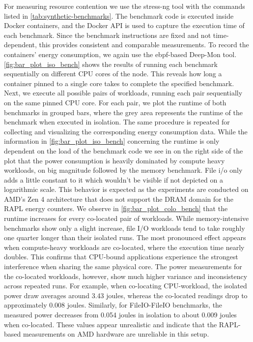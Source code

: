 For measuring resource contention we use the stress-ng tool with the commands listed in \ref{tab:synthetic-benchmarks}. The benchmark code is executed inside Docker containers, and the Docker API is used to capture the execution time of each benchmark. Since the benchmark instructions are fixed and not time-dependent, this provides consistent and comparable measurements. To record the containers' energy consumption, we again use the ebpf-based Deep-Mon tool.
\ref{fig:bar_plot_iso_bench} shows the results of running each benchmark sequentially on different CPU cores of the node. This reveals how long a container pinned to a single core takes to complete the specified benchmark. Next, we execute all possible pairs of workloads, running each pair sequentially on the same pinned CPU core. For each pair, we plot the runtime of both benchmarks in grouped bars, where the grey area represents the runtime of the benchmark when executed in isolation. The same procedure is repeated for collecting and visualizing the corresponding energy consumption data.
While the information in \ref{fig:bar_plot_iso_bench} concerning the runtime is only dependent on the load of the benchmark code we see in on the right side of the plot that the power consumption is heavily dominated by compute heavy workloads, on big magnitude followed by the memory benchmark. File i/o only adds a little constant to it which wouldn't be visible if not depicted on a logarithmic scale. This behavior is expected as the experiments are conducted on AMD's Zen 4 architecture that does not support the DRAM domain for the RAPL energy counters.
We observe in \ref{fig:bar_plot_colo_bench} that the runtime increases for every co-located pair of workloads. While memory-intensive benchmarks show only a slight increase, file I/O workloads tend to take roughly one quarter longer than their isolated runs. The most pronounced effect appears when compute-heavy workloads are co-located, where the execution time nearly doubles. This confirms that CPU-bound applications experience the strongest interference when sharing the same physical core.
The power measurements for the co-located workloads, however, show much higher variance and inconsistency across repeated runs. For example, when co-locating CPU-workload, the isolated power draw averages around 3.43 joules, whereas the co-located readings drop to approximately 0.008 joules. Similarly, for FileIO-FileIO benchmarks, the measured power decreases from 0.054 joules in isolation to about 0.009 joules when co-located. These values appear unrealistic and indicate that the RAPL-based measurements on AMD hardware are unreliable in this setup.

